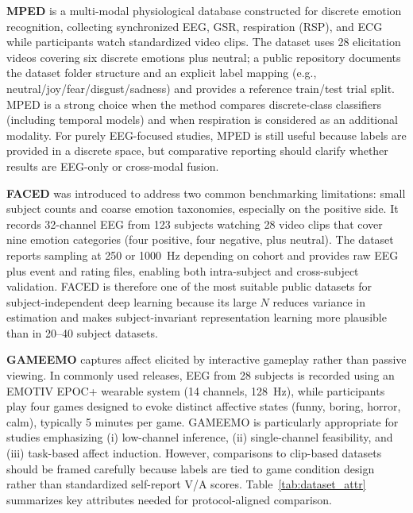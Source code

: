 \documentclass{WileyMSP-template}
\begin{document}
\textbf{MPED}
 is a multi-modal physiological database constructed for discrete emotion recognition, collecting synchronized EEG, GSR, respiration (RSP), and ECG while participants watch standardized video clips. The dataset uses 28 elicitation videos covering six discrete emotions plus neutral; a public repository documents the dataset folder structure and an explicit label mapping (e.g., neutral/joy/fear/disgust/sadness) and provides a reference train/test trial split. \cite{song2019mped}
MPED is a strong choice when the method compares discrete-class classifiers (including temporal models) and when respiration is considered as an additional modality. For purely EEG-focused studies, MPED is still useful because labels are provided in a discrete space, but comparative reporting should clarify whether results are EEG-only or cross-modal fusion. \cite{song2019mped}

\textbf{FACED}
 was introduced to address two common benchmarking limitations: small subject counts and coarse emotion taxonomies, especially on the positive side. It records 32-channel EEG from 123 subjects watching 28 video clips that cover nine emotion categories (four positive, four negative, plus neutral). The dataset reports sampling at 250 or 1000~Hz depending on cohort and provides raw EEG plus event and rating files, enabling both intra-subject and cross-subject validation. \cite{chen2023faced}
FACED is therefore one of the most suitable public datasets for subject-independent deep learning because its large $N$ reduces variance in estimation and makes subject-invariant representation learning more plausible than in 20--40 subject datasets. \cite{chen2023faced}

\textbf{GAMEEMO}
 captures affect elicited by interactive gameplay rather than passive viewing. In commonly used releases, EEG from 28 subjects is recorded using an EMOTIV EPOC+ wearable system (14 channels, 128~Hz), while participants play four games designed to evoke distinct affective states (funny, boring, horror, calm), typically 5 minutes per game. \cite{alakus2021gameemo}
GAMEEMO is particularly appropriate for studies emphasizing (i) low-channel inference, (ii) single-channel feasibility, and (iii) task-based affect induction. However, comparisons to clip-based datasets should be framed carefully because labels are tied to game condition design rather than standardized self-report V/A scores. \cite{alakus2021gameemo}
Table~\ref{tab:dataset_attr} summarizes key attributes needed for protocol-aligned comparison.
\end{document}
